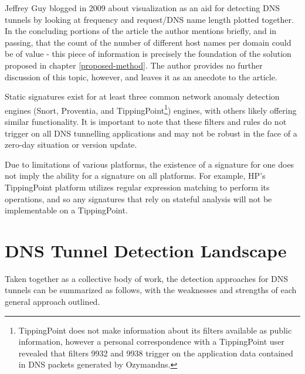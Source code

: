 \documentclass[12pt]{report}
\theoremstyle{remark}
\theoremstyle{definition}
\theoremstyle{definition}
\theoremstyle{definition}
\begin{document}
Jeffrey Guy\cite{Guy2009} blogged in 2009 about visualization as an aid for
detecting DNS tunnels by looking at frequency and request/DNS name length
plotted together. In the concluding portions of the article the author mentions
briefly, and in passing, that the count of the number of different host names
per domain could be of value - this piece of information is precisely the
foundation of the solution proposed in chapter \ref{proposed-method}. The author
provides no further discussion of this topic, however, and leaves it as an
anecdote to the article.

Static signatures exist for at least three common network anomaly detection
engines (Snort\cite{Chamberland2009.snort_iodine},
Proventia\cite{Proventia2013.ips_tunnel}, and TippingPoint\footnote{TippingPoint
does not make information about its filters available as public information,
however a personal correspondence with a TippingPoint user revealed that filters
9932 and 9938 trigger on the application data contained in DNS packets generated
by Ozymandns.}) engines, with others likely offering similar functionality. It
is important to note that these filters and rules do not trigger on all DNS
tunnelling applications and may not be robust in the face of a zero-day
situation or version update.

Due to limitations of various platforms, the existence of a signature for one
does not imply the ability for a signature on all platforms. For example, HP's
TippingPoint platform utilizes regular expression matching to perform its
operations, and so any signatures that rely on stateful analysis will not be
implementable on a TippingPoint.

\section{DNS Tunnel Detection Landscape}
\label{litreview-summary}
Taken
together as a collective body of work, the detection approaches for DNS tunnels
can be summarized as follows, with the weaknesses and strengths of each general
approach outlined.
\end{document}
